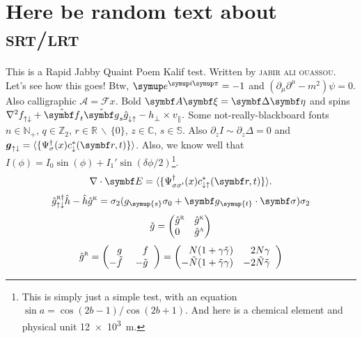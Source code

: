 \section{Here be random text about \textsc{srt/lrt}}\label{sec:test}
This is a Rapid Jabby Quaint Poem Kalif test.
Written by \textsc{jabir ali ouassou}.
Let's see how this goes! Btw, $\e^{\i\p} = -1$ and $(\partial_\mu \partial^\mu - m^2) \psi = 0$.
Also calligraphic $\mathcal{A} = \mathcal{F}x$.
Bold $\B{A}\B{\xi} = \B{\Delta}\B{\eta}$ and spins $\nabla^2 f_{\uparrow\downarrow}^{\vphantom{\dagger}}+\hat{\B{f}}_t\check{\B{g}}_s\hat{g}_{\downarrow\uparrow}^{\vphantom{\dagger}} - h_\perp^{\vphantom{*}} \times v_\parallel^{\vphantom{*}}.$
Some not-really-blackboard fonts $n \in \mathbb{N}_+$, $q \in \mathbb{Z}_2$, $r \in \mathbb{R}\,\backslash\,\{0\}$, $z \in \mathbb{C}$, $s \in \mathbb{S}$. 
Also $\partial_z I \sim \partial_z \Delta = 0$ and $\boldsymbol{g}_{\up\dn} = \langle \{ \Psi^\dagger_\sigma(x) c^\ast_\dn(\B{r},t) \} \rangle$.
Also, we know well that $I(\phi) = I_0 \sin(\phi) + I_1' \sin(\delta\phi/2)$\footnote{This is simply just a simple test, with an equation $\sin a = \cos(2b-1)/\cos(2b+1)$. And here is a chemical element  and physical unit \SI{12e3}{m}. }.
\begin{equation}
  \nabla\cdot \B{E} = \langle \{ \Psi^\dagger_{\sigma\sigma'}(x) c^\ast_{\dn\up}(\B{r},t) \} \rangle.
\end{equation}
\begin{equation}
  \hat{g}^{\textsc{r}\dagger}_{\up\dn}\hat{h} - \hat{h}\hat{g}^{\textsc{k}} = \sigma_2(g_{\symup{s}} \sigma_0 + \B{g}_{\hspace{0.05em}\symup{t}}\cdot\B{\sigma})\sigma_2
\end{equation}
\begin{equation}
  \check{g} = \begin{pmatrix} \hat{g}^{\textsc{r}} & \hat{g}^{\textsc{k}} \\ 0^{\phantom{k}} & \hat{g}^{\textsc{a}} \end{pmatrix}
\end{equation}
\begin{equation}
  \hat{g}^{\textsc{r}} = \begin{pmatrix} \phantom{-}g\; & \phantom{-}f\;\; \\ -\tilde{f}\; & -\tilde{g}\;\; \end{pmatrix}
= \begin{pmatrix} \phantom{-}N(1+\gamma\tilde{\gamma}) & \phantom{-}2N\gamma\;\; \\ -\tilde{N}(1+\tilde{\gamma}\gamma) & -2\tilde{N}\tilde\gamma\;\; \end{pmatrix} 
\end{equation}

